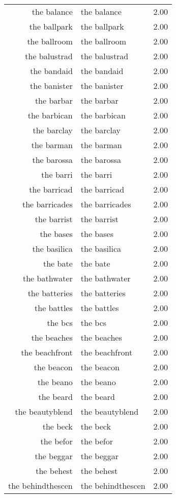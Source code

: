 \begin{table}[ht]
\begin{tabular}{rlr}
  the balance & the balance & 2.00 \\ 
  the ballpark & the ballpark & 2.00 \\ 
  the ballroom & the ballroom & 2.00 \\ 
  the balustrad & the balustrad & 2.00 \\ 
  the bandaid & the bandaid & 2.00 \\ 
  the banister & the banister & 2.00 \\ 
  the barbar & the barbar & 2.00 \\ 
  the barbican & the barbican & 2.00 \\ 
  the barclay & the barclay & 2.00 \\ 
  the barman & the barman & 2.00 \\ 
  the barossa & the barossa & 2.00 \\ 
  the barri & the barri & 2.00 \\ 
  the barricad & the barricad & 2.00 \\ 
  the barricades & the barricades & 2.00 \\ 
  the barrist & the barrist & 2.00 \\ 
  the bases & the bases & 2.00 \\ 
  the basilica & the basilica & 2.00 \\ 
  the bate & the bate & 2.00 \\ 
  the bathwater & the bathwater & 2.00 \\ 
  the batteries & the batteries & 2.00 \\ 
  the battles & the battles & 2.00 \\ 
  the bcs & the bcs & 2.00 \\ 
  the beaches & the beaches & 2.00 \\ 
  the beachfront & the beachfront & 2.00 \\ 
  the beacon & the beacon & 2.00 \\ 
  the beano & the beano & 2.00 \\ 
  the beard & the beard & 2.00 \\ 
  the beautyblend & the beautyblend & 2.00 \\ 
  the beck & the beck & 2.00 \\ 
  the befor & the befor & 2.00 \\ 
  the beggar & the beggar & 2.00 \\ 
  the behest & the behest & 2.00 \\ 
  the behindthescen & the behindthescen & 2.00 \\ 

\end{tabular}
\end{table}
